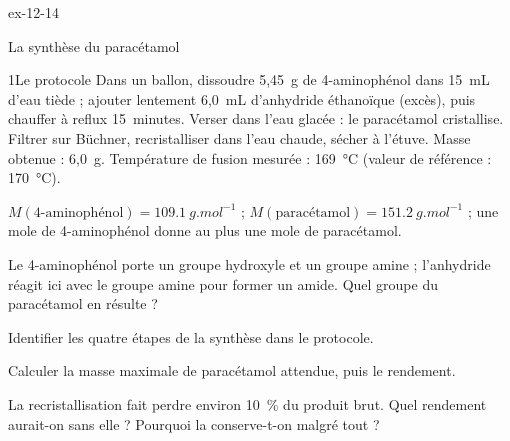 \begin{blocLivre}{ex-12-14}
\begin{exercice}[3]{La synthèse du paracétamol}
\begin{docu}{1}{Le protocole}
Dans un ballon, dissoudre 5,45~g de 4-aminophénol dans 15~mL d'eau tiède ; ajouter lentement 6,0~mL d'anhydride
éthanoïque (excès), puis chauffer à reflux 15~minutes. Verser dans l'eau glacée : le paracétamol cristallise. Filtrer
sur Büchner, recristalliser dans l'eau chaude, sécher à l'étuve. Masse obtenue : 6,0~g. Température de fusion
mesurée : 169~°C (valeur de référence : 170~°C).
\end{docu}
\begin{donnees}
$M(\text{4-aminophénol})=\qty{109,1}{g.mol^{-1}}$ ; $M(\text{paracétamol})=\qty{151,2}{g.mol^{-1}}$ ; une mole de
4-aminophénol donne au plus une mole de paracétamol.
\end{donnees}
\begin{questions}
\item Le 4-aminophénol porte un groupe hydroxyle et un groupe amine ; l'anhydride réagit ici avec le groupe amine pour
former un amide. Quel groupe du paracétamol en résulte ?
\item Identifier les quatre étapes de la synthèse dans le protocole.
\item Calculer la masse maximale de paracétamol attendue, puis le rendement.
\item \initiative La recristallisation fait perdre environ 10~\% du produit brut. Quel rendement aurait-on sans
elle ? Pourquoi la conserve-t-on malgré tout ?
\end{questions}
\end{exercice}
\end{blocLivre}
